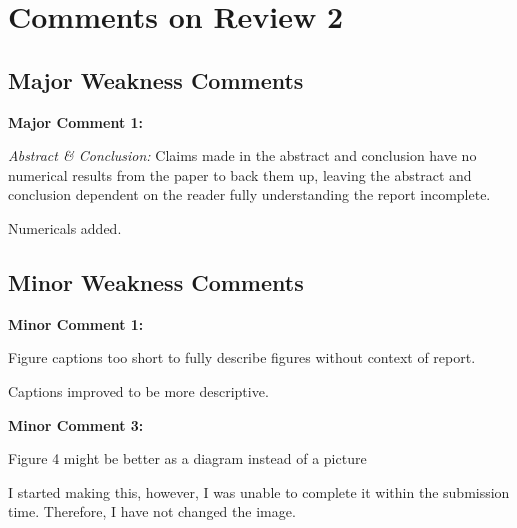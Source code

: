 \documentclass[%
 aip,
cp,  %
 amsmath,amssymb,
 reprint,%
]{revtex4-2}
\begin{document}
\section{Comments on Review 2}

    \subsection{Major Weakness Comments}

        \begin{mdframed} \textbf{Major Comment 1:}
            
            \textit{Abstract \& Conclusion:} Claims made in the abstract and conclusion have no numerical results from the paper to back them up, leaving the abstract and conclusion dependent on the reader fully understanding the report incomplete.
        \end{mdframed}
        {\color{red}
        
            Numericals added.
        
        }
    \subsection{Minor Weakness Comments}

        \begin{mdframed} \textbf{Minor Comment 1:}

            Figure captions too short to fully describe figures without context of report.
        \end{mdframed}
        {\color{red}
        
            Captions improved to be more descriptive.

        }
       
        \begin{mdframed} \textbf{Minor Comment 3:}

            Figure 4 might be better as a diagram instead of a picture

        \end{mdframed}  
        {\color{red}
            I started making this, however, I was unable to complete it within the submission time. Therefore, I have not changed the image. 
        }
        
\newpage

\end{document}
